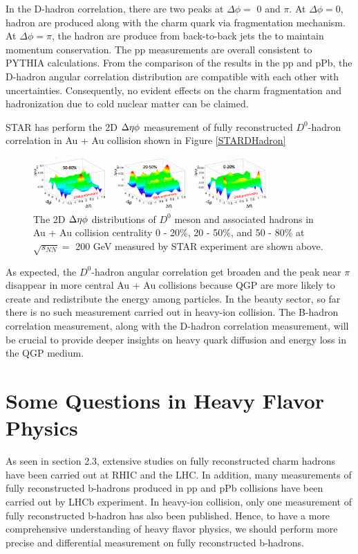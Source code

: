 In the D-hadron correlation, there are two peaks at $\Delta \phi =$ 0 and $\pi$. At $\Delta \phi = $0, hadron are produced along with the charm quark via fragmentation mechanism. At $\Delta \phi = \pi$, the hadron are produce from back-to-back jets the to maintain momentum conservation. The pp measurements are overall consistent to PYTHIA calculations. From the comparison of the results in the pp and pPb, the D-hadron angular correlation distribution are compatible with each other with uncertainties. Consequently, no evident effects on the
charm fragmentation and hadronization due to cold nuclear matter can be claimed. 

STAR has perform the 2D $\Delta \eta \time \Delta \phi$ measurement of fully reconstructed $D^0$-hadron correlation in Au + Au collision shown in Figure \ref{STARDHadron}

\begin{figure}[hbtp]
\begin{center}
\includegraphics[width=0.80\textwidth]{Figures/Chapter2/STARDHadron.png}
\caption{The 2D $\Delta \eta \time \Delta \phi$ distributions of $D^0$ meson and associated hadrons in Au + Au collision centrality 0 - 20\%, 20 - 50\%, and 50 - 80\% at $\sqrt{s_{NN}} = $ 200 GeV measured by STAR experiment are shown above.}
\label{ALICEDHadron}
\end{center}
\end{figure} 

As expected, the $D^0$-hadron angular correlation get broaden and the peak near $\pi$ disappear in more central Au + Au collisions because QGP are more likely to create and redistribute the energy among particles. In the beauty sector, so far there is no such measurement carried out in heavy-ion collision. The B-hadron correlation measurement, along with the D-hadron correlation measurement, will be crucial to provide deeper insights on heavy quark diffusion and energy loss in the QGP medium. 

\section{Some Questions in Heavy Flavor Physics}

As seen in section 2.3, extensive studies on fully reconstructed charm hadrons have been carried out at RHIC and the LHC. In addition, many measurements of fully reconstructed b-hadrons produced in pp and pPb collisions have been carried out by LHCb experiment. In heavy-ion collision, only one measurement of fully reconstructed b-hadron has also been published. Hence, to have a more comprehensive understanding of heavy flavor physics, we should perform more precise and differential measurement on fully reconstructed b-hadrons. 

